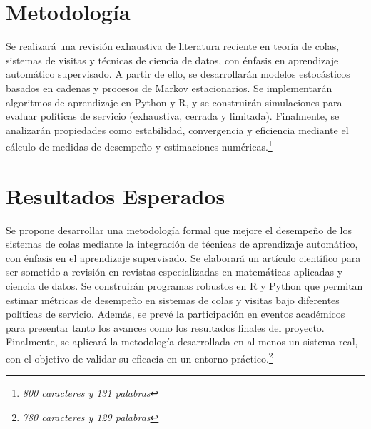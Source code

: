 \documentclass[12pt]{article}
\begin{document}
\section{Metodología}
Se realizará una revisión exhaustiva de literatura reciente en teoría de colas, sistemas de visitas y técnicas de ciencia de datos, con énfasis en aprendizaje automático supervisado. A partir de ello, se desarrollarán modelos estocásticos basados en cadenas y procesos de Markov estacionarios. Se implementarán algoritmos de aprendizaje en Python y R, y se construirán simulaciones para evaluar políticas de servicio (exhaustiva, cerrada y limitada). Finalmente, se analizarán propiedades como estabilidad, convergencia y eficiencia mediante el cálculo de medidas de desempeño y estimaciones numéricas.\footnote{\textit{800 caracteres y 131 palabras}}

\section{Resultados Esperados}

Se propone desarrollar una metodología formal que mejore el desempeño de los sistemas de colas mediante la integración de técnicas de aprendizaje automático, con énfasis en el aprendizaje supervisado. Se elaborará un artículo científico para ser sometido a revisión en revistas especializadas en matemáticas aplicadas y ciencia de datos. Se construirán programas robustos en R y Python que permitan estimar métricas de desempeño en sistemas de colas y visitas bajo diferentes políticas de servicio. Además, se prevé la participación en eventos académicos para presentar tanto los avances como los resultados finales del proyecto. Finalmente, se aplicará la metodología desarrollada en al menos un sistema real, con el objetivo de validar su eficacia en un entorno práctico.\footnote{\textit{780 caracteres y 129 palabras}}

\end{document}
